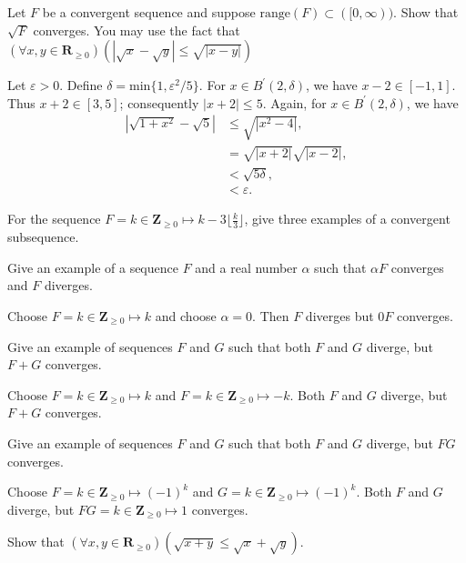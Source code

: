 \documentclass[12pt, fleqn, answers]{exam}
\newcommand{\reals}{\mathbf{R}}
\newcommand{\integers}{\mathbf{Z}}
\newcommand{\range}{\mathrm{range}}
\begin{document}
\begin{questions}
\begin{solution}
\end{solution}

\question Let $F$ be a convergent sequence and suppose $\range(F) \subset([0,\infty))$. Show that $\sqrt{F}$ converges.
You may use the fact that $\left(\forall x,y \in \reals_{\geq 0}\right)  (| \sqrt{x} - \sqrt{y} | \leq \sqrt{|x - y|} )$

\begin{solution}
Let \(\varepsilon > 0\). Define \(\delta = \mbox{min}\{1, \varepsilon^2 / 5\}\). 
For \(x \in B^\prime(2, \delta)\), we
have \(x - 2 \in [-1,1]\). Thus \(x + 2 \in [3,5]\); consequently
\(|x+2| \leq 5\). Again, for \(x \in B^\prime(2, \delta)\), we have
\begin{align*}
  |\sqrt{1+x^2} - \sqrt{5} | &\leq \sqrt{|x^2 - 4|}, \\ 
                             &= \sqrt{|x + 2|} \sqrt{|x - 2|}, \\
                             &< \sqrt{5 \delta}, \\
                             &< \varepsilon.
\end{align*}
\end{solution}

\question For the sequence $F  = k \in \integers_{\geq 0} \mapsto k - 3 \lfloor \frac{k}{3} \rfloor $, give three examples of
a convergent subsequence.

\question Give an example of a sequence $F$ and a real number $\alpha$ such that $\alpha F$ converges and $F$ diverges.
\begin{solution} Choose $F = k \in \integers_{\geq 0} \mapsto k$ and choose $\alpha = 0$. Then $F$ diverges but $0F$ 
converges.
\end{solution}
 \question Give an example of sequences $F$ and $G$ such that both $F$ and $G$ diverge, but $F+ G$ converges.
 \begin{solution} Choose $F = k \in \integers_{\geq 0} \mapsto k$ and $F = k \in \integers_{\geq 0} \mapsto -k$.
 Both $F$ and $G$ diverge, but $F+G$ converges.
 \end{solution}
 
  \question Give an example of sequences $F$ and $G$ such that both $F$ and $G$ diverge, but $F G$ converges.
 \begin{solution} Choose $F = k \in \integers_{\geq 0} \mapsto (-1)^k$ and $G = k \in \integers_{\geq 0} \mapsto (-1)^k$.
 Both $F$ and $G$ diverge, but $F G =  k \in \integers_{\geq 0} \mapsto 1$ converges.
 \end{solution}
\question Show that $\left(\forall x,y \in \reals_{\geq 0}\right)(\sqrt{x+y} \leq \sqrt{x} +\sqrt{y})$.


\end{questions}
\end{document}
